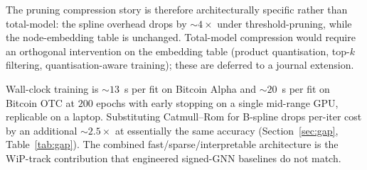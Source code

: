 The pruning compression story is therefore architecturally specific
rather than total-model: the spline overhead drops by $\sim\!4\times$
under threshold-pruning, while the node-embedding table is
unchanged. Total-model compression would require an orthogonal
intervention on the embedding table (product quantisation,
top-$k$ filtering, quantisation-aware training); these are deferred
to a journal extension.

Wall-clock training is $\sim\!13$~s per fit on Bitcoin Alpha and
$\sim\!20$~s per fit on Bitcoin OTC at $200$ epochs with early
stopping on a single mid-range GPU, replicable on a laptop.
Substituting Catmull--Rom for B-spline drops per-iter cost by an
additional $\sim\!2.5\times$ at essentially the same accuracy
(Section~\ref{sec:gap}, Table~\ref{tab:gap}). The combined
fast/sparse/interpretable architecture is the WiP-track contribution
that engineered signed-GNN baselines do not match.